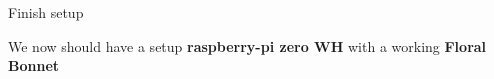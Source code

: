 \begin{frame}
   {Finish setup}

   We now should have a setup \textbf{raspberry-pi zero WH}
	with a working \textbf{Floral Bonnet}

\end{frame}

\cprotect\note{


}

